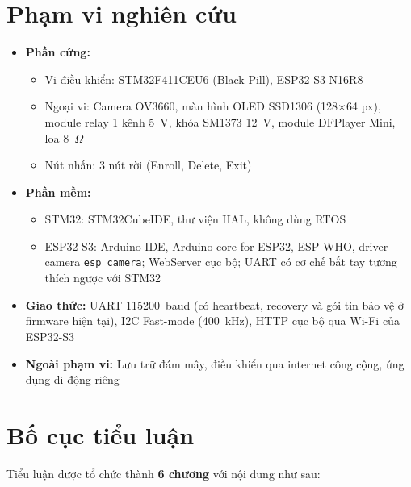 \section{Phạm vi nghiên cứu}
\label{sec:scope}

\begin{itemize}
  \item \textbf{Phần cứng:}
    \begin{itemize}
      \item Vi điều khiển: STM32F411CEU6 (Black Pill), ESP32-S3-N16R8
      \item Ngoại vi: Camera OV3660, màn hình OLED SSD1306 (128$\times$64 px), module relay 1 kênh 5~V, khóa SM1373 12~V, module DFPlayer Mini, loa 8~$\Omega$
      \item Nút nhấn: 3 nút rời (Enroll, Delete, Exit)
    \end{itemize}
  \item \textbf{Phần mềm:}
    \begin{itemize}
      \item STM32: STM32CubeIDE, thư viện HAL, không dùng RTOS
      \item ESP32-S3: Arduino IDE, Arduino core for ESP32, ESP-WHO, driver camera \texttt{esp\_camera}; WebServer cục bộ; UART có cơ chế bắt tay tương thích ngược với STM32
    \end{itemize}
  \item \textbf{Giao thức:} UART 115200~baud (có heartbeat, recovery và gói tin bảo vệ ở firmware hiện tại), I2C Fast-mode (400~kHz), HTTP cục bộ qua Wi-Fi của ESP32-S3
  \item \textbf{Ngoài phạm vi:} Lưu trữ đám mây, điều khiển qua internet công cộng, ứng dụng di động riêng
\end{itemize}

\section{Bố cục tiểu luận}
\label{sec:structure}

Tiểu luận được tổ chức thành \textbf{6 chương} với nội dung như sau:

